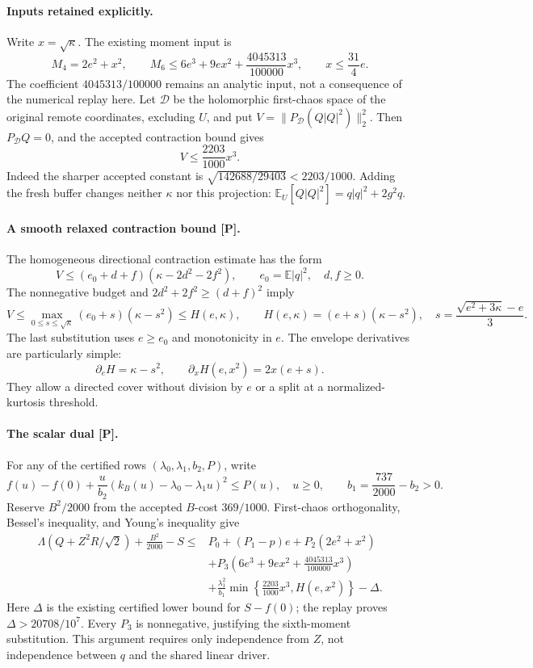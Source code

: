 \paragraph{Inputs retained explicitly.}
Write \(x=\sqrt\kappa\). The existing moment input is
\[
 M_4=2e^2+x^2,\qquad
 M_6\le6e^3+9ex^2+\frac{4045313}{100000}x^3,
 \qquad x\le\frac{31}{4}e.
\]
The coefficient \(4045313/100000\) remains an analytic input, not a
consequence of the numerical replay here.
Let \(\mathcal D\) be the holomorphic first-chaos space of the original
remote coordinates, excluding \(U\), and put
\(V=\|P_{\mathcal D}(Q|Q|^2)\|_2^2\).
Then \(P_{\mathcal D}Q=0\), and the accepted contraction bound gives
\[
 V\le\frac{2203}{1000}x^3.
\]
Indeed the sharper accepted constant is
\(\sqrt{142688/29403}<2203/1000\).
Adding the fresh buffer changes neither \(\kappa\) nor this projection:
\(\mathbb E_U[Q|Q|^2]=q|q|^2+2g^2q\).

\paragraph{A smooth relaxed contraction bound [P].}
The homogeneous directional contraction estimate has the form
\[
 V\le(e_0+d+f)(\kappa-2d^2-2f^2),\qquad
 e_0=\mathbb E|q|^2,\quad d,f\ge0.
\]
The nonnegative budget and \(2d^2+2f^2\ge(d+f)^2\) imply
\[
 V\le\max_{0\le s\le\sqrt\kappa}(e_0+s)(\kappa-s^2)
 \le H(e,\kappa),
 \qquad
 H(e,\kappa)=(e+s)(\kappa-s^2),\quad
 s=\frac{\sqrt{e^2+3\kappa}-e}{3}.
\]
The last substitution uses \(e\ge e_0\) and monotonicity in \(e\).
The envelope derivatives are particularly simple:
\[
 \partial_eH=\kappa-s^2,\qquad
 \partial_xH(e,x^2)=2x(e+s).
\]
They allow a directed cover without division by \(e\) or a split at a
normalized-kurtosis threshold.

\paragraph{The scalar dual [P].}
For any of the certified rows
\((\lambda_0,\lambda_1,b_2,P)\), write
\[
 f(u)-f(0)+\frac{u}{b_2}
       (k_B(u)-\lambda_0-\lambda_1u)^2\le P(u),
 \quad u\ge0,\qquad
 b_1=\frac{737}{2000}-b_2>0.
\]
Reserve \(B^2/2000\) from the accepted \(B\)-cost \(369/1000\).
First-chaos orthogonality, Bessel's inequality, and Young's inequality
give
\begin{align*}
 \Lambda(Q+Z^2R/\sqrt2)+\frac{B^2}{2000}-S
 \le{}&P_0+(P_1-p)e+P_2(2e^2+x^2)\\
 &+P_3\left(6e^3+9ex^2+\frac{4045313}{100000}x^3\right)\\
 &+\frac{\lambda_1^2}{b_1}
       \min\left\{\frac{2203}{1000}x^3,H(e,x^2)\right\}
       -\Delta .
\end{align*}
Here \(\Delta\) is the existing certified lower bound for \(S-f(0)\);
the replay proves \(\Delta>20708/10^7\).
Every \(P_3\) is nonnegative, justifying the sixth-moment substitution.
This argument requires only independence from \(Z\), not independence
between \(q\) and the shared linear driver.

